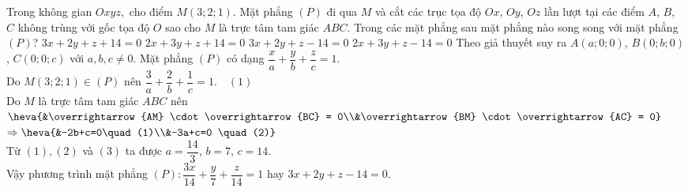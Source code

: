 \begin{ex}%
Trong không gian $ Oxyz, $	cho điểm $ M(3;2;1) $. Mặt phẳng $ (P) $ đi qua $ M $ và cắt các trục tọa độ $ Ox $, $ Oy $, $ Oz $ lần lượt tại các điểm $ A $, $ B $, $ C $ không trùng với gốc tọa độ $ O $ sao cho $ M $ là trực tâm tam giác $ ABC $. Trong các mặt phẳng sau mặt phẳng nào song song với mặt phẳng $ (P) $?
	\choice
	{\True $ 3x + 2y + z + 14 = 0 $}
	{$ 2x + 3y + z + 14 = 0 $}
	{$ 3x + 2y + z - 14 = 0 $}
	{$ 2x + 3y + z - 14 = 0 $}
	\loigiai
	{Theo giả thuyết suy ra $ A(a;0;0) $, $ B(0;b;0) $, $ C(0;0;c) $ với $ a,b,c \ne 0 $. Mặt phẳng $ (P) $ có dạng $ \dfrac{x}{a} + \dfrac{y}{b} + \dfrac{z}{c} = 1 $.\\
		Do $ M(3;2;1) \in (P)$  nên $ \dfrac{3}{a} + \dfrac{2}{b} + \dfrac{1}{c} = 1. \quad (1)$\\
		Do $ M $ là trực tâm tam giác $ ABC $ nên $ \heva{&\overrightarrow{AM} \cdot \overrightarrow{BC} = 0\\&\overrightarrow{BM} \cdot \overrightarrow{AC} = 0}  $ $ \Rightarrow\heva{&-2b+c=0\quad (1)\\&-3a+c=0 \quad (2)} $\\
		Từ $ (1), (2) $ và $ (3) $ ta được $ a = \dfrac{14}{3} $, $ b= 7 $, $ c = 14. $\\
		Vậy phương trình mặt phẳng $ (P) \colon \dfrac{3x}{14} + \dfrac{y}{7} + \dfrac{z}{14} = 1 $ hay $ 3x + 2y + z - 14 = 0. $
	}
\end{ex}

